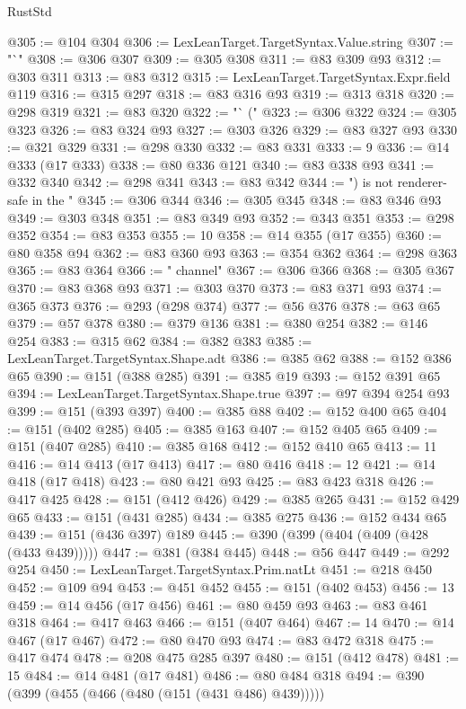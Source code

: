 \begin{lexlean}{RustStd}
\begin{coremodule}
@305 := @104 @304
@306 := LexLeanTarget.TargetSyntax.Value.string
@307 := "`"
@308 := @306 @307
@309 := @305 @308
@311 := @83 @309 @93
@312 := @303 @311
@313 := @83 @312
@315 := LexLeanTarget.TargetSyntax.Expr.field @119
@316 := @315 @297
@318 := @83 @316 @93
@319 := @313 @318
@320 := @298 @319
@321 := @83 @320
@322 := "` ("
@323 := @306 @322
@324 := @305 @323
@326 := @83 @324 @93
@327 := @303 @326
@329 := @83 @327 @93
@330 := @321 @329
@331 := @298 @330
@332 := @83 @331
@333 := 9
@336 := @14 @333 (@17 @333)
@338 := @80 @336 @121
@340 := @83 @338 @93
@341 := @332 @340
@342 := @298 @341
@343 := @83 @342
@344 := ") is not renderer-safe in the "
@345 := @306 @344
@346 := @305 @345
@348 := @83 @346 @93
@349 := @303 @348
@351 := @83 @349 @93
@352 := @343 @351
@353 := @298 @352
@354 := @83 @353
@355 := 10
@358 := @14 @355 (@17 @355)
@360 := @80 @358 @94
@362 := @83 @360 @93
@363 := @354 @362
@364 := @298 @363
@365 := @83 @364
@366 := " channel"
@367 := @306 @366
@368 := @305 @367
@370 := @83 @368 @93
@371 := @303 @370
@373 := @83 @371 @93
@374 := @365 @373
@376 := @293 (@298 @374)
@377 := @56 @376
@378 := @63 @65
@379 := @57 @378
@380 := @379 @136
@381 := @380 @254
@382 := @146 @254
@383 := @315 @62
@384 := @382 @383
@385 := LexLeanTarget.TargetSyntax.Shape.adt
@386 := @385 @62
@388 := @152 @386 @65
@390 := @151 (@388 @285)
@391 := @385 @19
@393 := @152 @391 @65
@394 := LexLeanTarget.TargetSyntax.Shape.true
@397 := @97 @394 @254 @93
@399 := @151 (@393 @397)
@400 := @385 @88
@402 := @152 @400 @65
@404 := @151 (@402 @285)
@405 := @385 @163
@407 := @152 @405 @65
@409 := @151 (@407 @285)
@410 := @385 @168
@412 := @152 @410 @65
@413 := 11
@416 := @14 @413 (@17 @413)
@417 := @80 @416
@418 := 12
@421 := @14 @418 (@17 @418)
@423 := @80 @421 @93
@425 := @83 @423 @318
@426 := @417 @425
@428 := @151 (@412 @426)
@429 := @385 @265
@431 := @152 @429 @65
@433 := @151 (@431 @285)
@434 := @385 @275
@436 := @152 @434 @65
@439 := @151 (@436 @397) @189
@445 := @390 (@399 (@404 (@409 (@428 (@433 @439)))))
@447 := @381 (@384 @445)
@448 := @56 @447
@449 := @292 @254
@450 := LexLeanTarget.TargetSyntax.Prim.natLt
@451 := @218 @450
@452 := @109 @94
@453 := @451 @452
@455 := @151 (@402 @453)
@456 := 13
@459 := @14 @456 (@17 @456)
@461 := @80 @459 @93
@463 := @83 @461 @318
@464 := @417 @463
@466 := @151 (@407 @464)
@467 := 14
@470 := @14 @467 (@17 @467)
@472 := @80 @470 @93
@474 := @83 @472 @318
@475 := @417 @474
@478 := @208 @475 @285 @397
@480 := @151 (@412 @478)
@481 := 15
@484 := @14 @481 (@17 @481)
@486 := @80 @484 @318
@494 := @390 (@399 (@455 (@466 (@480 (@151 (@431 @486) @439)))))

\end{coremodule}
\end{lexlean}
